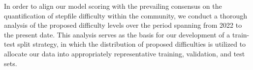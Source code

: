 \vspace{2mm}


In order to align our model scoring with the prevailing consensus on the quantification of stepfile difficulty within the community, we conduct a thorough analysis of the proposed difficulty levels over the period spanning from 2022 to the present date. This analysis serves as the basis for our development of a train-test split strategy, in which the distribution of proposed difficulties is utilized to allocate our data into appropriately representative training, validation, and test sets.
